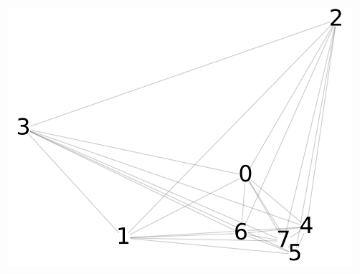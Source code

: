 \documentclass[10pt]{beamer}
\begin{document}
\begin{frame}[fragile]{}
\begin{figure}[ht]
\begin{subfigure}{.33 \linewidth}
{    \includegraphics[scale=0.15]{persistence_diagrams/distances/graphs/wasserstein_h2_graph.pdf}
    }
  \end{subfigure}%
\end{figure}
\end{frame}
\end{document}
